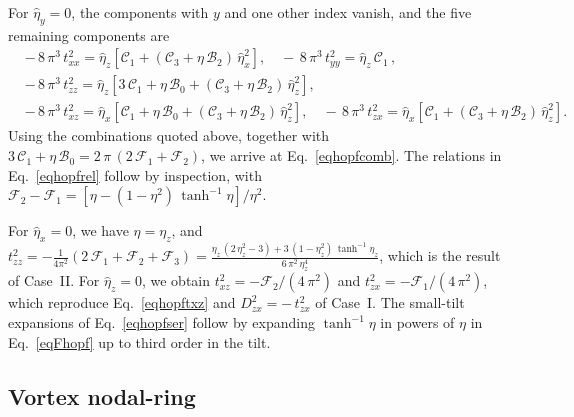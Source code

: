 \documentclass[aps,prb,onecolumn,nofootinbib,citeautoscript,10pt]{revtex4-2}
\def \nn{\nonumber \\}
\begin{document}
For $\hat\eta_y=0$, the components with $y$ and one other index vanish, and the five remaining components are
\begin{align}
& -\,8\,\pi^3\,t^2_{xx} = \hat\eta_z \left[ \mathscr C_1 + (\mathscr C_3+\eta\,\mathscr B_2)\,\hat\eta_x^2 \right] , \quad
-\,8\,\pi^3\,t^2_{yy} = \hat\eta_z\,\mathscr C_1 \,, \nn &
-\,8\,\pi^3\,t^2_{zz} = \hat\eta_z \left[ 3\,\mathscr C_1 + \eta\,\mathscr B_0 + (\mathscr C_3+\eta\,\mathscr B_2)\,\hat\eta_z^2 \right] , \nn &
-\,8\,\pi^3\,t^2_{xz} = \hat\eta_x \left[ \mathscr C_1 + \eta\,\mathscr B_0 + (\mathscr C_3+\eta\,\mathscr B_2)\,\hat\eta_z^2 \right] , \quad
-\,8\,\pi^3\,t^2_{zx} = \hat\eta_x \left[ \mathscr C_1 + (\mathscr C_3+\eta\,\mathscr B_2)\,\hat\eta_z^2 \right] .
\end{align}
Using the combinations quoted above, together with $3\,\mathscr C_1+\eta\,\mathscr B_0=2\,\pi\,(2\,\mathcal F_1+\mathcal F_2)$, we arrive at Eq.~\eqref{eqhopfcomb}. The relations in Eq.~\eqref{eqhopfrel} follow by inspection, with $\mathcal F_2-\mathcal F_1=[\eta-(1-\eta^2)\,\tanh^{-1}\eta]/\eta^2$.

For $\hat\eta_x=0$, we have $\eta=\eta_z$, and $t^2_{zz}=-\frac{1}{4\pi^2}\left(2\,\mathcal F_1+\mathcal F_2+\mathcal F_3\right)=\frac{\eta_z\,(2\,\eta_z^2-3)+3\,(1-\eta_z^2)\,\tanh^{-1}\eta_z}{6\,\pi^2\,\eta_z^4}$, which is the result of Case~II. For $\hat\eta_z=0$, we obtain $t^2_{xz}=-\mathcal F_2/(4\,\pi^2)$ and $t^2_{zx}=-\mathcal F_1/(4\,\pi^2)$, which reproduce Eq.~\eqref{eqhopftxz} and $D^2_{zx}=-\,t^2_{zx}$ of Case~I. The small-tilt expansions of Eq.~\eqref{eqhopfser} follow by expanding $\tanh^{-1}\eta$ in powers of $\eta$ in Eq.~\eqref{eqFhopf} up to third order in the tilt.

\subsection{Vortex nodal-ring}
\end{document}
